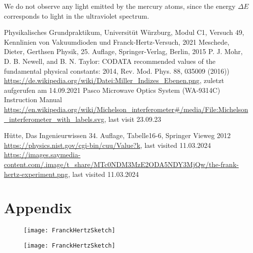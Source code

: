 \documentclass[a4paper,10pt,twocolumn]{article}
\begin{document}
    We do not observe any light emitted by the mercury atoms, since the energy $\Delta E$ corresponds to light in the
    ultraviolet spectrum.
    
    
    
    



    \begin{thebibliography}{}    %
         Physikalisches Grundpraktikum, Universitüt Würzburg, Modul C1, Versuch 49, Kennlinien von Vakuumdioden
        und Franck-Hertz-Versuch, 2021
         Meschede, Dieter, Gerthsen Physik, 25. Auflage, Springer-Verlag, Berlin, 2015
         P. J. Mohr, D. B. Newell, and B. N. Taylor: \grqq CODATA
        recommended values of the fundamental physical constants: 2014\grqq , Rev. Mod. Phys.
        88, 035009 (2016))
         \url{https://de.wikipedia.org/wiki/Datei:Miller_Indizes_Ebenen.png}, zuletzt aufgerufen am 14.09.2021
         Pasco Microwave Optics System (WA-9314C) Instruction Manual
         \url{https://en.wikipedia.org/wiki/Michelson_interferometer#/media/File:Michelson_interferometer_with_labels.svg}, last visit 23.09.23
        
          Hütte, Das Ingenieurwissen 34. Auflage, Tabelle16-6, Springer Vieweg 2012
          \url{https://physics.nist.gov/cgi-bin/cuu/Value?k}, last visited 11.03.2024
         \url{https://images.saymedia-content.com/.image/t_share/MTc0NDM3MzE2ODA5NDY3MjQw/the-frank-hertz-experiment.png}, last visited 11.03.2024
    \end{thebibliography}
    
    \section{Appendix}

    \begin{figure}[htbp]
        \texttt{[image: FranckHertzSketch]}
        \center
        \caption{}
        \label{fig:energyLevelsHg}
    \end{figure}

    \begin{figure}[htbp]
        \texttt{[image: FranckHertzSketch]}
        \center
        \caption{}
        \label{fig:energyLevelsNe}
    \end{figure}
\end{document}
